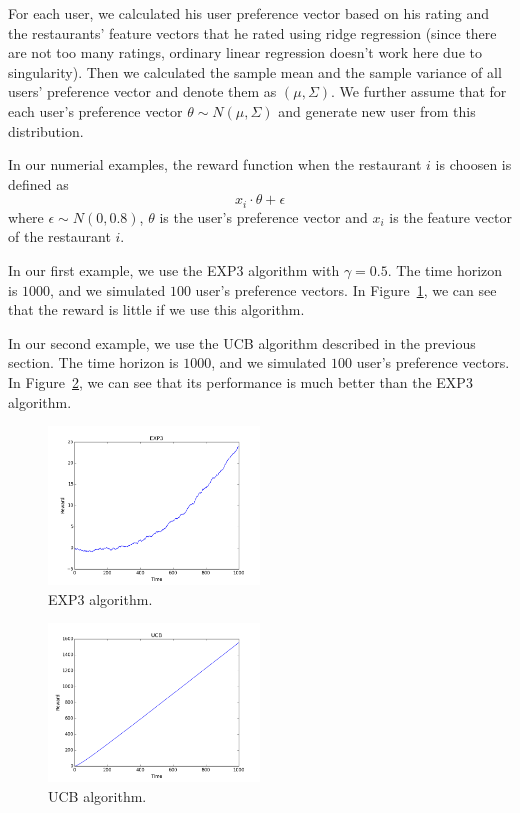 \documentclass{article}
\theoremstyle{plain}
\theoremstyle{definition}
\begin{document}
For each user, we calculated his user preference vector based on his rating and the restaurants' feature vectors that he rated using ridge regression (since there are not too many ratings, ordinary linear regression doesn't work here due to singularity). Then we calculated the sample mean and the sample variance of all users' preference vector and denote them as $(\mu,\Sigma)$. We further assume that for each user's preference vector $\theta\sim N(\mu,\Sigma)$ and generate new user from this distribution.

In our numerial examples, the reward function when the restaurant
$i$ is choosen is defined as 
\[
x_{i}\cdot\theta+\epsilon
\]
where $\epsilon\sim N\left(0,0.8\right)$, $\theta$ is the user's
preference vector and $x_{i}$ is the feature vector of the restaurant
$i$.

In our first example, we use the EXP3 algorithm with $\gamma=0.5$.
The time horizon is $1000$, and we simulated $100$ user's preference
vectors. In Figure~\ref{fig: tahi}, we can see that the reward is little if we use this algorithm.

In our second example, we use the UCB algorithm described in the previous
section. The time horizon is $1000$, and we simulated $100$ user's
preference vectors.  In Figure~\ref{fig: tah2}, we can see that its performance is much better
than the EXP3 algorithm. 



\begin{figure}[htb]
{
\centering
\includegraphics[width=0.50\textwidth]{plot11}
\caption{EXP3 algorithm. \label{fig: tahi}}
}
\end{figure}

\begin{figure}[htb]
{
\centering
\includegraphics[width=0.50\textwidth]{UCB1}
\caption{UCB algorithm. \label{fig: tah2}}
}
\end{figure}
\end{document}
